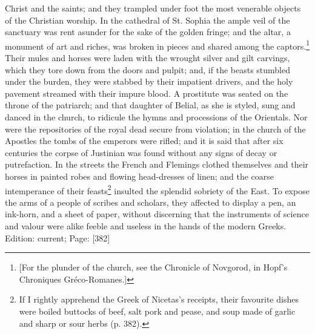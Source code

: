 Christ and the saints; and they trampled under foot the most venerable objects of the Christian worship. In the cathedral of St. Sophia the ample veil of the sanctuary was rent asunder for the sake of the golden fringe; and the altar, a monument of art and riches, was broken in pieces and shared among the captors.\footnote{[For the plunder of the church, see the Chronicle of Novgorod, in Hopf\texthebrew{}’s Chroniques Gréco-Romanes.]} Their mules and horses were laden with the wrought silver and gilt carvings, which they tore down from the doors and pulpit; and, if the beasts stumbled under the burden, they were stabbed by their impatient drivers, and the holy pavement streamed with their impure blood. A prostitute was seated on the throne of the patriarch; and that daughter of Belial, as she is styled, sung and danced in the church, to ridicule the hymns and processions of the Orientals. Nor were the repositories of the royal dead secure from violation; in the church of the Apostles the tombs of the emperors were rifled; and it is said that after six centuries the corpse of Justinian was found without any signs of decay or putrefaction. In the streets the French and Flemings clothed themselves and their horses in painted robes and flowing head-dresses of linen; and the coarse intemperance of their feasts\footnote{If I rightly apprehend the Greek of Nicetas\texthebrew{}’s receipts, their favourite dishes were boiled buttocks of beef, salt pork and pease, and soup made of garlic and sharp or sour herbs (p. 382).} insulted the splendid sobriety of the East. To expose the arms of a people of scribes and scholars, they affected to display a pen, an ink-horn, and a sheet of paper, without discerning that the instruments of science and valour were alike feeble and useless in the hands of the modern Greeks.
Edition: current; Page: [382]

